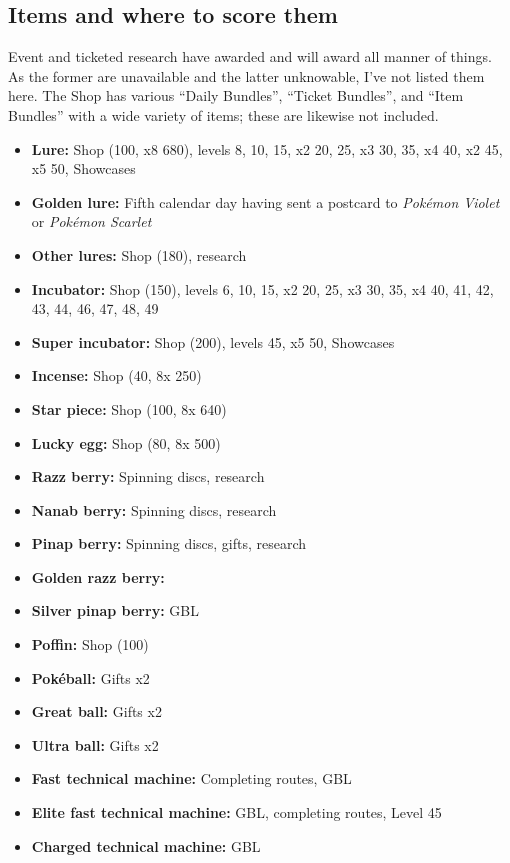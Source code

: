 \subsection{Items and where to score them\label{subsec:items}}
Event and ticketed research have awarded and will award all manner of things.
As the former are unavailable and the latter unknowable, I've not listed them here.
The Shop has various ``Daily Bundles'', ``Ticket Bundles'', and ``Item Bundles'' with
 a wide variety of items; these are likewise not included.
\begin{itemize}[noitemsep]
\item \textbf{Lure:} Shop (100\coin, x8 680\coin), levels 8, 10, 15, x2 20, 25, x3 30, 35, x4 40, x2 45, x5 50, Showcases
\item \textbf{Golden lure:} Fifth calendar day having sent a postcard to \textit{Pokémon Violet} or \textit{Pokémon Scarlet}
\item \textbf{Other lures:} Shop (180\coin), research
\item \textbf{Incubator:} Shop (150\coin), levels 6, 10, 15, x2 20, 25, x3 30, 35, x4 40, 41, 42, 43, 44, 46, 47, 48, 49
\item \textbf{Super incubator:} Shop (200\coin), levels 45, x5 50, Showcases
\item \textbf{Incense:} Shop (40\coin, 8x 250\coin)
\item \textbf{Star piece:} Shop (100\coin, 8x 640\coin)
\item \textbf{Lucky egg:} Shop (80\coin, 8x 500\coin)
\item \textbf{Razz berry:} Spinning discs, research
\item \textbf{Nanab berry:} Spinning discs, research
\item \textbf{Pinap berry:} Spinning discs, gifts, research
\item \textbf{Golden razz berry:}
\item \textbf{Silver pinap berry:} GBL
\item \textbf{Poffin:} Shop (100\coin)
\item \textbf{Pokéball:} Gifts x2
\item \textbf{Great ball:} Gifts x2
\item \textbf{Ultra ball:} Gifts x2
\item \textbf{Fast technical machine:} Completing routes, GBL
\item \textbf{Elite fast technical machine:} GBL, completing routes, Level 45
\item \textbf{Charged technical machine:} GBL

\end{itemize}
